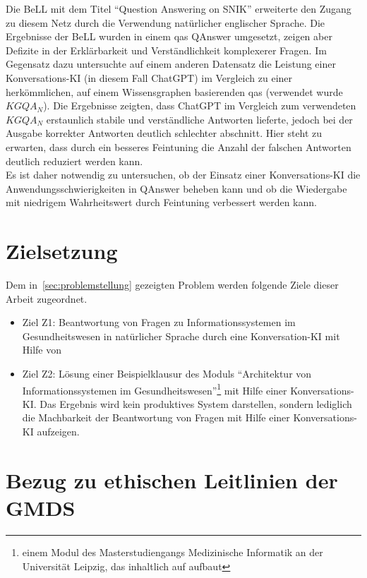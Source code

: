 Die BeLL mit dem Titel \enquote{Question Answering on SNIK} \citep{hannesbell} erweiterte den Zugang zu diesem Netz durch die Verwendung natürlicher englischer Sprache. 
Die Ergebnisse der BeLL wurden in einem \ac{qas} QAnswer \citep{qanswer} umgesetzt, zeigen aber Defizite in der Erklärbarkeit und Verständlichkeit komplexerer Fragen. 
Im Gegensatz dazu untersuchte \citet{chatgpt_qas} auf einem anderen Datensatz die Leistung einer Konversations-KI (in diesem Fall ChatGPT) im Vergleich zu einer herkömmlichen, auf einem Wissensgraphen basierenden \ac{qas} (verwendet wurde $KGQA_N$).
Die Ergebnisse zeigten, dass ChatGPT im Vergleich zum verwendeten $KGQA_N$ erstaunlich stabile und verständliche Antworten lieferte, jedoch bei der Ausgabe korrekter Antworten deutlich schlechter abschnitt. Hier steht zu erwarten, dass durch ein besseres Feintuning die Anzahl der falschen Antworten deutlich reduziert werden kann.\\

Es ist daher notwendig zu untersuchen, ob der Einsatz einer Konversations-KI die Anwendungsschwierigkeiten in QAnswer beheben kann und ob die Wiedergabe mit niedrigem Wahrheitswert durch Feintuning verbessert werden kann.

\section{Zielsetzung}\label{sec:zielsetzung}

Dem in~\ref{sec:problemstellung} gezeigten Problem werden folgende Ziele dieser Arbeit zugeordnet.
\begin{itemize}
  \item Ziel Z1: Beantwortung von Fragen zu Informationssystemen im Gesundheitswesen in natürlicher Sprache durch eine Konversation-KI mit Hilfe von \citet{bb}
  \item Ziel Z2: Lösung einer Beispielklausur des Moduls \enquote{Architektur von Informationssystemen im Gesundheitswesen}\footnote{\raggedright{}einem Modul des Masterstudiengangs Medizinische Informatik an der Universität Leipzig, das inhaltlich auf \citet{bb} aufbaut} mit Hilfe einer Konversations-KI.\@
  Das Ergebnis wird kein produktives System darstellen, sondern lediglich die Machbarkeit der Beantwortung von Fragen mit Hilfe einer Konversations-KI aufzeigen.
\end{itemize}

\section{Bezug zu ethischen Leitlinien der GMDS}

